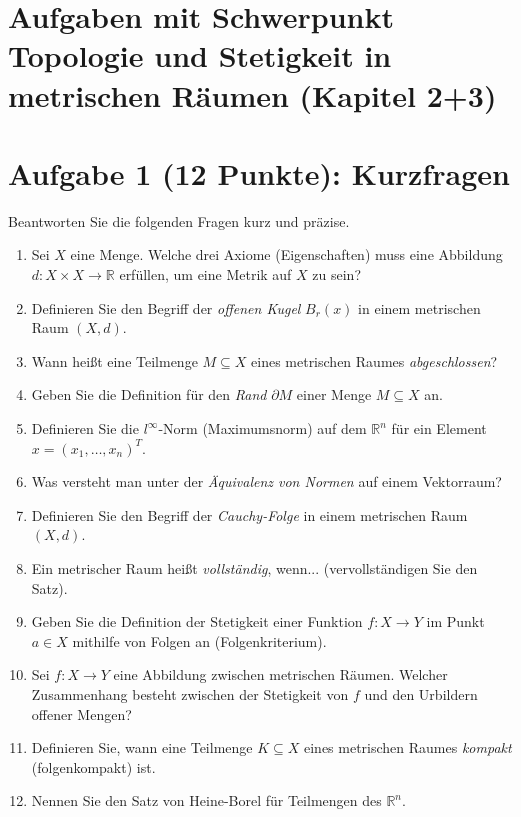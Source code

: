 \newpage
\section{Aufgaben mit Schwerpunkt Topologie und Stetigkeit in metrischen Räumen (Kapitel 2+3)}

\section*{Aufgabe 1 (12 Punkte): Kurzfragen}
Beantworten Sie die folgenden Fragen kurz und präzise.

\begin{enumerate}
    \item Sei $X$ eine Menge. Welche drei Axiome (Eigenschaften) muss eine Abbildung $d: X \times X \to \mathbb{R}$ erfüllen, um eine Metrik auf $X$ zu sein?
    \item Definieren Sie den Begriff der \textit{offenen Kugel} $B_r(x)$ in einem metrischen Raum $(X, d)$.
    \item Wann heißt eine Teilmenge $M \subseteq X$ eines metrischen Raumes \textit{abgeschlossen}?
    \item Geben Sie die Definition für den \textit{Rand} $\partial M$ einer Menge $M \subseteq X$ an.
    \item Definieren Sie die $l^{\infty}$-Norm (Maximumsnorm) auf dem $\mathbb{R}^n$ für ein Element $x = (x_1, \dots, x_n)^T$.
    \item Was versteht man unter der \textit{Äquivalenz von Normen} auf einem Vektorraum?
    \item Definieren Sie den Begriff der \textit{Cauchy-Folge} in einem metrischen Raum $(X, d)$.
    \item Ein metrischer Raum heißt \textit{vollständig}, wenn... (vervollständigen Sie den Satz).
    \item Geben Sie die Definition der Stetigkeit einer Funktion $f: X \to Y$ im Punkt $a \in X$ mithilfe von Folgen an (Folgenkriterium).
    \item Sei $f: X \to Y$ eine Abbildung zwischen metrischen Räumen. Welcher Zusammenhang besteht zwischen der Stetigkeit von $f$ und den Urbildern offener Mengen?
    \item Definieren Sie, wann eine Teilmenge $K \subseteq X$ eines metrischen Raumes \textit{kompakt} (folgenkompakt) ist.
    \item Nennen Sie den Satz von Heine-Borel für Teilmengen des $\mathbb{R}^n$.
\end{enumerate}

